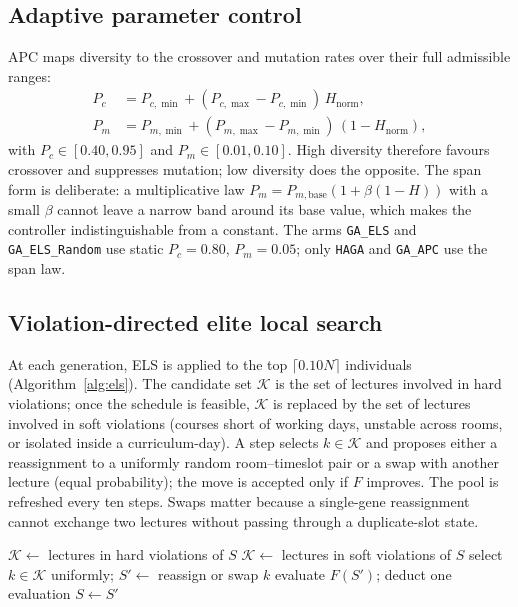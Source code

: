 \documentclass[journal]{IEEEtran}
\newcommand{\code}[1]{\texttt{#1}}
\begin{document}
\subsection{Adaptive parameter control}
APC maps diversity to the crossover and mutation rates over their full admissible ranges:
\begin{align}
P_c &= P_{c,\min} + (P_{c,\max}-P_{c,\min})\,H_{\mathrm{norm}},\\
P_m &= P_{m,\min} + (P_{m,\max}-P_{m,\min})\,(1-H_{\mathrm{norm}}),
\end{align}
with $P_c\in[0.40,0.95]$ and $P_m\in[0.01,0.10]$. High diversity therefore favours crossover and suppresses mutation; low diversity does the opposite. The span form is deliberate: a multiplicative law $P_m=P_{m,\mathrm{base}}(1+\beta(1-H))$ with a small $\beta$ cannot leave a narrow band around its base value, which makes the controller indistinguishable from a constant. The arms \code{GA\_ELS} and \code{GA\_ELS\_Random} use static $P_c=0.80$, $P_m=0.05$; only \code{HAGA} and \code{GA\_APC} use the span law.

\subsection{Violation-directed elite local search}
At each generation, ELS is applied to the top $\lceil 0.10N\rceil$ individuals (Algorithm~\ref{alg:els}). The candidate set $\mathcal{K}$ is the set of lectures involved in hard violations; once the schedule is feasible, $\mathcal{K}$ is replaced by the set of lectures involved in soft violations (courses short of working days, unstable across rooms, or isolated inside a curriculum-day). A step selects $k\in\mathcal{K}$ and proposes either a reassignment to a uniformly random room--timeslot pair or a swap with another lecture (equal probability); the move is accepted only if $F$ improves. The pool is refreshed every ten steps. Swaps matter because a single-gene reassignment cannot exchange two lectures without passing through a duplicate-slot state.

\begin{algorithm}[!t]
\caption{Violation-Directed Elite Local Search}
\label{alg:els}
\begin{algorithmic}[1]
            \State $\mathcal{K}\gets$ lectures in hard violations of $S$
                \State $\mathcal{K}\gets$ lectures in soft violations of $S$
            \EndIf
        \EndIf
        \State select $k\in\mathcal{K}$ uniformly; $S'\gets$ reassign or swap $k$
        \State evaluate $F(S')$; deduct one evaluation
         $S\gets S'$ \EndIf
    \EndFor
\EndFor
\end{algorithmic}
\end{algorithm}
\end{document}
